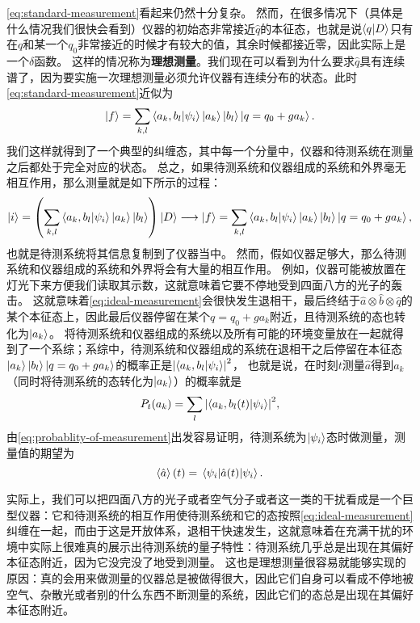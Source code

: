 \documentclass[UTF8, a4paper]{ctexart}
\begin{document}
\eqref{eq:standard-measurement}看起来仍然十分复杂。
然而，在很多情况下（具体是什么情况我们很快会看到）仪器的初始态非常接近$\hat{q}$的本征态，也就是说$\braket{q}{D}$只有在$q$和某一个$q_0$非常接近的时候才有较大的值，其余时候都接近零，因此实际上是一个$\delta$函数。
这样的情况称为\textbf{理想测量}。我们现在可以看到为什么要求$\hat{q}$具有连续谱了，因为要实施一次理想测量必须允许仪器有连续分布的状态。此时\eqref{eq:standard-measurement}近似为
\begin{equation}
    \ket{f} = \sum_{k, l} \braket{a_k, b_l}{\psi_i} \ket{a_k} \ket{b_l} \ket{q = q_0 + g a_k}.
    \label{eq:ideal-measurement}
\end{equation}
我们这样就得到了一个典型的纠缠态，其中每一个分量中，仪器和待测系统在测量之后都处于完全对应的状态。
总之，如果待测系统和仪器组成的系统和外界毫无相互作用，那么测量就是如下所示的过程：
\[
    \ket{i} = \left(\sum_{k, l} \braket{a_k, b_l}{\psi_i} \ket{a_k} \ket{b_l} \right) \ket{D} \longrightarrow \ket{f} = \sum_{k, l} \braket{a_k, b_l}{\psi_i} \ket{a_k} \ket{b_l} \ket{q = q_0 + g a_k},
\]
也就是待测系统将其信息复制到了仪器当中。
然而，假如仪器足够大，那么待测系统和仪器组成的系统和外界将会有大量的相互作用。
例如，仪器可能被放置在灯光下来方便我们读取其示数，这就意味着它要不停地受到四面八方的光子的轰击。
这就意味着\eqref{eq:ideal-measurement}会很快发生退相干，最后终结于$\hat{a} \otimes \hat{b} \otimes \hat{q}$的某个本征态上，因此最后仪器停留在某个$q=q_0 + g a_k$附近，且待测系统的态也转化为$\ket{a_k}$。
将待测系统和仪器组成的系统以及所有可能的环境变量放在一起就得到了一个系综；系综中，待测系统和仪器组成的系统在退相干之后停留在本征态$\ket{a_k} \ket{b_l} \ket{q = q_0 + g a_k}$的概率正是$\abs{\braket{a_k, b_l}{\psi_i}}^2$，
也就是说，在时刻$t$测量$\hat{a}$得到$a_k$（同时将待测系统的态转化为$\ket{a_k}$）的概率就是
\begin{equation}
    P_t(a_k) = \sum_l \abs{\braket{a_k, b_l(t)}{\psi_i}}^2,
    \label{eq:probablity-of-measurement}
\end{equation}
由\eqref{eq:probablity-of-measurement}出发容易证明，待测系统为$\ket{\psi_i}$态时做测量，测量值的期望为
\begin{equation}
    \expval{\hat{a}}(t) = \mel{\psi_i}{\hat{a}(t)}{\psi_i}.
\end{equation}

实际上，我们可以把四面八方的光子或者空气分子或者这一类的干扰看成是一个巨型仪器：它和待测系统的相互作用使待测系统和它的态按照\eqref{eq:ideal-measurement}纠缠在一起，而由于这是开放体系，退相干快速发生，这就意味着在充满干扰的环境中实际上很难真的展示出待测系统的量子特性：待测系统几乎总是出现在其偏好本征态附近，因为它没完没了地受到测量。
这也是理想测量很容易就能够实现的原因：真的会用来做测量的仪器总是被做得很大，因此它们自身可以看成不停地被空气、杂散光或者别的什么东西不断测量的系统，因此它们的态总是出现在其偏好本征态附近。
\end{document}
